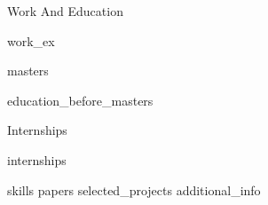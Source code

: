 \documentclass{resume} %
\begin{document}


\begin{rSection}{\faInstitution \hspace{0.5mm} Work And Education}

    {work_ex}
    
    {masters}
    
    {education_before_masters}

\end{rSection}


\begin{rSection}{\faBriefcase \hspace{0.5mm} Internships}

    {internships}

\end{rSection}


{skills}
{papers}
{selected_projects}
{additional_info}

\end{document}
